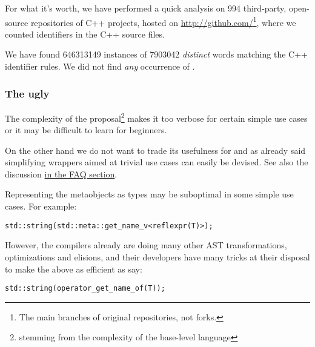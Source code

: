 For what it's worth, we have performed a quick analysis on \num{994} third-party,
open-source repositories of C++ projects, hosted on
\url{http://github.com/}\footnote{The main branches of original repositories,
not forks.}, where we counted identifiers in the C++ source files.

We have found \num{646313149} instances of \num{7903042} {\em distinct} words
matching the C++ identifier rules.  We did not find {\em any} occurrence of
.

\subsubsection{The ugly}

The complexity of the proposal\footnote{stemming from the complexity of the
base-level language} makes it too verbose for certain simple use cases
or it may be difficult to learn for beginners.

On the other hand we do not want to trade its usefulness for 
and as already said simplifying wrappers aimed at trivial use cases can easily
be devised. See also the discussion \hyperref[faq-hard-on-novices]{in the FAQ
section}.

Representing the metaobjects as types may be suboptimal in some simple
use cases. For example:

\begin{verbatim}
std::string(std::meta::get_name_v<reflexpr(T)>);
\end{verbatim}

However, the compilers already are doing many other AST transformations,
optimizations and elisions, and their developers have many tricks at their
disposal to make the above as efficient as say:

\begin{verbatim}
std::string(operator_get_name_of(T));
\end{verbatim}

